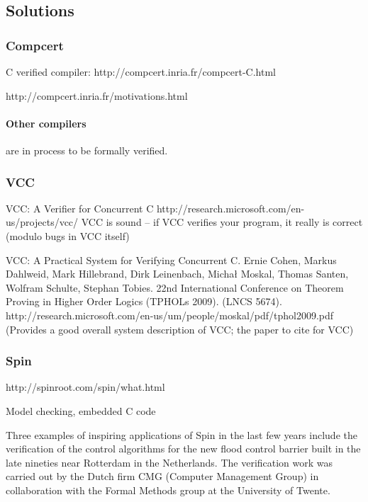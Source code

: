 \subsection{Solutions}

\subsubsection{Compcert}

C verified compiler:  http://compcert.inria.fr/compcert-C.html

http://compcert.inria.fr/motivations.html


\paragraph{Other compilers} are in process to be formally verified.

\subsubsection{VCC}

VCC: A Verifier for Concurrent C  http://research.microsoft.com/en-us/projects/vcc/
VCC is sound -- if VCC verifies your program, it really is correct (modulo bugs in VCC itself)

VCC: A Practical System for Verifying Concurrent C. Ernie Cohen, Markus Dahlweid, Mark Hillebrand, Dirk Leinenbach, Michał Moskal, Thomas Santen, Wolfram Schulte, Stephan Tobies. 22nd International Conference on Theorem Proving in Higher Order Logics (TPHOLs 2009). (LNCS 5674). http://research.microsoft.com/en-us/um/people/moskal/pdf/tphol2009.pdf (Provides a good overall system description of VCC; the paper to cite for VCC)


\subsubsection{Spin}

http://spinroot.com/spin/what.html

Model checking, embedded C code

Three examples of inspiring applications of Spin in the last few years include the verification of the control algorithms for the new flood control barrier built in the late nineties near Rotterdam in the Netherlands. The verification work was carried out by the Dutch firm CMG (Computer Management Group) in collaboration with the Formal Methods group at the University of Twente.